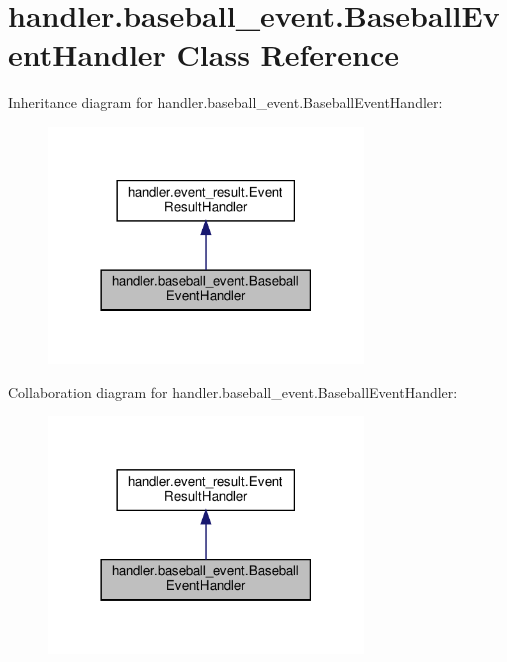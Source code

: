 \hypertarget{classhandler_1_1baseball__event_1_1_baseball_event_handler}{}\section{handler.\+baseball\+\_\+event.\+Baseball\+Event\+Handler Class Reference}
\label{classhandler_1_1baseball__event_1_1_baseball_event_handler}


Inheritance diagram for handler.\+baseball\+\_\+event.\+Baseball\+Event\+Handler\+:\nopagebreak
\begin{figure}[H]
\begin{center}
\leavevmode
\includegraphics[width=237pt]{classhandler_1_1baseball__event_1_1_baseball_event_handler__inherit__graph}
\end{center}
\end{figure}


Collaboration diagram for handler.\+baseball\+\_\+event.\+Baseball\+Event\+Handler\+:\nopagebreak
\begin{figure}[H]
\begin{center}
\leavevmode
\includegraphics[width=237pt]{classhandler_1_1baseball__event_1_1_baseball_event_handler__coll__graph}
\end{center}
\end{figure}
